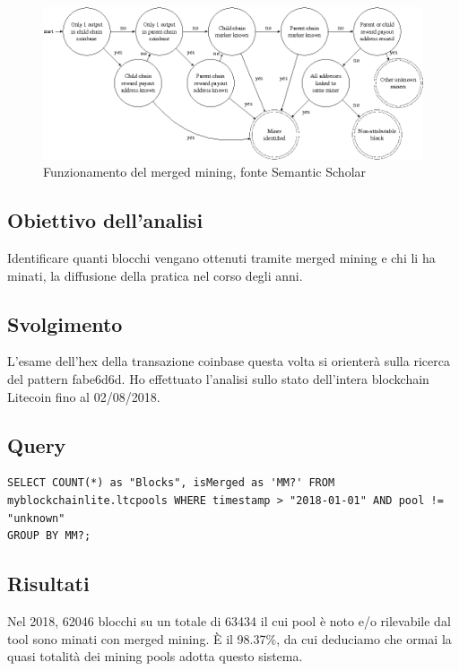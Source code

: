 \begin{figure}
	\centering
	\includegraphics[width=1.0\linewidth]{images/mergedminingdiagramsemanticscholar}
	\caption{Funzionamento del merged mining, fonte Semantic Scholar}
	\label{fig:mergedminingdiagramsemanticscholar}
\end{figure}

\subsection{Obiettivo dell’analisi}
Identificare quanti blocchi vengano ottenuti tramite merged mining e chi li ha minati, la diffusione della pratica nel corso degli anni.
\subsection{Svolgimento}
L’esame dell’hex della transazione coinbase questa volta si orienterà sulla ricerca del pattern fabe6d6d. Ho effettuato l’analisi sullo stato dell’intera blockchain Litecoin fino al 02/08/2018.
\subsection{Query}

\begin{lstlisting}
SELECT COUNT(*) as "Blocks", isMerged as 'MM?' FROM myblockchainlite.ltcpools WHERE timestamp > "2018-01-01" AND pool != "unknown"
GROUP BY MM?;
\end{lstlisting}

\subsection{Risultati}


Nel 2018, 62046 blocchi su un totale di 63434 il cui pool è noto e/o rilevabile dal tool sono minati con merged mining. È il 98.37\%, da cui deduciamo che ormai la quasi totalità dei mining pools adotta questo sistema.


